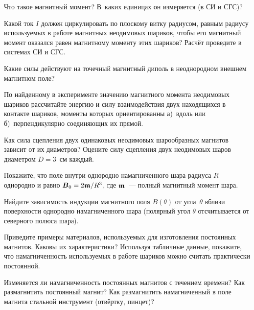 \begin{lab:questions}

\item Что такое магнитный момент? 
В~каких единицах он измеряется (в СИ и СГС)?

\item Какой ток $I$ должен циркулировать по плоскому витку радиусом, равным радиусу
используемых в работе магнитных неодимовых шариков, чтобы его магнитный момент
оказался равен магнитному моменту этих шариков? Расчёт проведите 
в системах СИ и СГС.

\item Какие силы действуют на точечный магнитный диполь 
в неоднородном внешнем магнитном поле?

\item По найденному в эксперименте значению магнитного момента неодимовых 
шариков рассчитайте энергию и силу взаимодействия двух находящихся 
в контакте шариков, моменты которых ориентированны а)~вдоль или 
б)~перпендикулярно соединяющих их прямой.

\item Как сила сцепления двух одинаковых неодимовых шарообразных магнитов 
зависит от их диаметров? Оцените силу сцепления двух 
неодимовых шаров диаметром $D=3$~см каждый. 

\item Покажите, что поле внутри однородно намагниченного шара 
радиуса  $R$ однородно и равно ${\boldsymbol{B}}_0=2{\boldsymbol{\mathfrak{m}}}/R^3$, 
где ${\boldsymbol{\mathfrak{m}}}$~--- полный магнитный момент шара. 

\item Найдите зависимость индукции магнитного поля  $B(\theta )$ 
от угла~$\theta $ вблизи поверхности однородно намагниченного шара 
(полярный угол $\theta $ отсчитывается от северного полюса шара).


\item Приведите примеры материалов, используемых для изготовления 
постоянных магнитов. Каковы их характеристики? Используя табличные данные,
покажите, что намагниченность используемых в работе шариков можно 
считать практически постоянной.

\item Изменяется ли намагниченность постоянных магнитов с течением времени? 
Как размагнитить постоянный магнит? 
Как размагнитить намагниченный в поле магнита стальной инструмент 
(отвёртку,  пинцет)?


\end{lab:questions}
